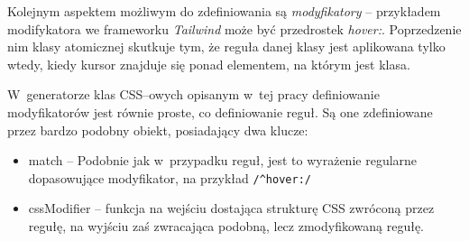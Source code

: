 \documentclass{SGGW-thesis}
\begin{document}
Kolejnym aspektem możliwym do zdefiniowania są \emph{modyfikatory} -- przykładem modifykatora we frameworku \emph{Tailwind} może być przedrostek \emph{hover:}. Poprzedzenie nim klasy atomicznej skutkuje tym, że reguła danej klasy jest aplikowana tylko wtedy, kiedy kursor znajduje się ponad elementem, na którym jest klasa.

W~generatorze klas CSS--owych opisanym w~tej pracy definiowanie modyfikatorów jest równie proste, co definiowanie reguł. Są one zdefiniowane przez bardzo podobny obiekt, posiadający dwa klucze:
\begin{itemize}
    \item match -- Podobnie jak w~przypadku reguł, jest to wyrażenie regularne dopasowujące modyfikator, na przykład \verb|/^hover:/|
    \item cssModifier -- funkcja na wejściu dostająca strukturę CSS zwróconą przez regułę, na wyjściu zaś zwracająca podobną, lecz zmodyfikowaną regułę.
\end{itemize}
\end{document}
